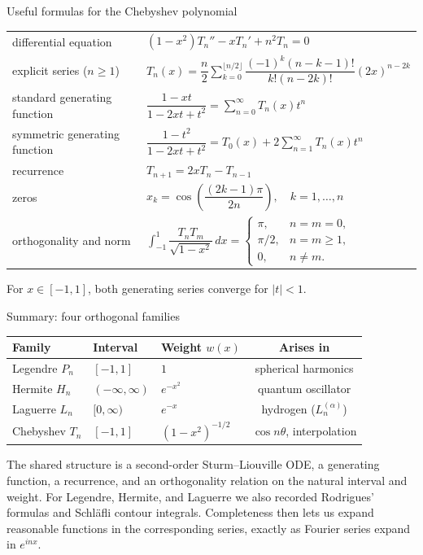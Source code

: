 \documentclass[11pt]{beamer}
\begin{document}
\begin{frame}{Useful formulas for the Chebyshev polynomial}
\footnotesize
\begin{center}
\renewcommand{\arraystretch}{1.65}
\begin{tabular}{ll}
differential equation
  & $(1-x^2)T_n''-xT_n'+n^2T_n=0$ \\
explicit series ($n\ge1$)
  & $T_n(x)=\dfrac{n}{2}
       \displaystyle\sum_{k=0}^{\lfloor n/2\rfloor}
       \dfrac{(-1)^k(n-k-1)!}{k!(n-2k)!}(2x)^{n-2k}$ \\
standard generating function
  & $\dfrac{1-xt}{1-2xt+t^2}
       =\displaystyle\sum_{n=0}^{\infty}T_n(x)t^n$ \\
symmetric generating function
  & $\dfrac{1-t^2}{1-2xt+t^2}
       =T_0(x)+2\displaystyle\sum_{n=1}^{\infty}T_n(x)t^n$ \\
recurrence
  & $T_{n+1}=2xT_n-T_{n-1}$ \\
zeros
  & $x_k=\cos\!\left(\dfrac{(2k-1)\pi}{2n}\right),
       \quad k=1,\ldots,n$ \\
orthogonality and norm
  & $\displaystyle\int_{-1}^{1}
       \dfrac{T_nT_m}{\sqrt{1-x^2}}\,dx
       =\begin{cases}
          \pi, & n=m=0,\\
          \pi/2, & n=m\ge1,\\
          0, & n\ne m .
        \end{cases}$
\end{tabular}
\end{center}
\vspace{0.2em}
{\footnotesize For $x\in[-1,1]$, both generating series converge for
$|t|<1$.}
\end{frame}

\begin{frame}{Summary: four orthogonal families}
\footnotesize
\begin{center}
\renewcommand{\arraystretch}{1.5}
\begin{tabular}{lllc}
\textbf{Family} & \textbf{Interval} & \textbf{Weight $w(x)$} & \textbf{Arises in} \\
\hline
Legendre $P_n$ & $[-1,1]$ & $1$ & spherical harmonics \\
Hermite $H_n$  & $(-\infty,\infty)$ & $e^{-x^2}$ & quantum oscillator \\
Laguerre $L_n$ & $[0,\infty)$ & $e^{-x}$ & hydrogen ($L_n^{(\alpha)}$) \\
Chebyshev $T_n$ & $[-1,1]$ & $(1-x^2)^{-1/2}$ & $\cos n\theta$, interpolation \\
\end{tabular}
\end{center}
\vspace{0.6em}
The shared structure is a second-order Sturm--Liouville ODE, a generating function, a
recurrence, and an orthogonality relation on the natural interval and weight. For Legendre,
Hermite, and Laguerre we also recorded Rodrigues' formulas and Schl\"afli contour integrals.
Completeness then lets us expand reasonable functions in the corresponding series, exactly
as Fourier series expand in $e^{inx}$.
\end{frame}
\end{document}
